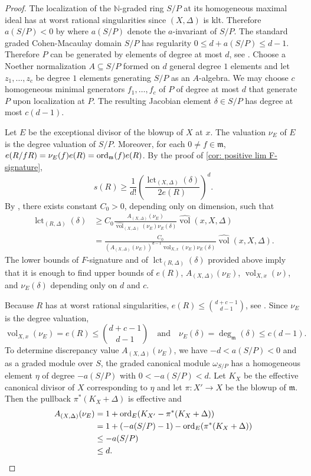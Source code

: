 \documentclass[12pt]{amsart}
\numberwithin{equation}{theorem}
\theoremstyle{plain}
\DeclareMathOperator{\vol}{vol}
\newcommand{\fm}{\mathfrak{m}}
\newcommand{\NN}{\mathbb{N}}
\DeclareMathOperator{\lct}{lct}
\begin{document}
\begin{proof}
    The localization of the $\NN$-graded ring $S/P$ at its homogeneous maximal ideal has at worst rational singularities since $(X,\Delta)$ is klt. Therefore $a(S/P)<0$ by \cite[Theorem~5.1]{KuranoSatoSinghWatanabe2009} where $a(S/P)$ denote the $a$-invariant of $S/P$. The standard graded Cohen-Macaulay domain $S/P$ has regularity $0\leq d+a(S/P)\leq d-1$. Therefore $P$ can be generated by elements of degree at most $d$, see \cite[Section~4a]{Eisenbud2005}. Choose a Noether normalization $A\subseteq S/P$ formed on $d$ general degree $1$ elements and let $z_1,\ldots,z_c$ be degree $1$ elements generating $S/P$ as an $A$-algebra. We may choose $c$ homogeneous minimal generators $f_1,\ldots,f_c$ of $P$ of degree at most $d$ that generate $P$ upon localization at $P$. The resulting Jacobian element $\delta\in S/P$ has degree at most $c(d-1)$.


    Let $E$ be the exceptional divisor of the blowup of $X$ at $x$. The valuation $\nu_E$ of $E$ is the degree valuation of $S/P$. Moreover, for each $0\not=f\in \fm$, $e(R/fR) = \nu_E(f)e(R) = \ord_{\fm}(f)e(R)$. By the proof of \cref{cor: positive lim F-signature}, 
    \[
    s(R) \geq \frac{1}{d!}\left(\frac{\lct_{(X,\Delta)}(\delta)}{2e(R)}\right)^d.
    \]
     By \cite[Lemma~3.4]{Zhuang24}, there exists constant $C_0>0$, depending only on dimension, such that 
    \begin{align*}
    \lct_{(R,\Delta)}(\delta)&\geq C_0 \frac{A_{(X,\Delta)}(\nu_E)}{\widehat{\vol}_{(X,\Delta)}(\nu_E)\nu_E(\delta)}\widehat{\vol}(x,X,\Delta)\\
    &=\frac{C_0}{(A_{(X,\Delta)}(\nu_E))^{d-1}\vol_{X,x}(\nu_E) \nu_E(\delta)}\widehat{\vol}(x,X,\Delta).
    \end{align*}
    The lower bounds of $F$-signature and of $\lct_{(R,\Delta)}(\delta)$ provided above imply that it is enough to find upper bounds of $e(R)$, $A_{(X,\Delta)}(\nu_E)$, $\vol_{X,x}(\nu)$, and $\nu_E(\delta)$ depending only on $d$ and $c$.

    Because $R$ has at worst rational singularities, $e(R)\leq {{d+c-1}\choose{d-1}}$, see \cite[Theorem~3.1]{HunekeWatanabe}. Since $\nu_E$ is the degree valuation, 
    \[
    \vol_{X,x}(\nu_E) = e(R)\leq {{d+c-1}\choose{d-1}}\quad\mbox{and}\quad \nu_E(\delta) = \deg_{\fm}(\delta)\leq c(d-1).
    \]
    To determine discrepancy value $A_{(X,\Delta)}(\nu_E)$, we have $-d<a(S/P)<0$ and as a graded module over $S$, the graded canonical module $\omega_{S/P}$ has a homogeneous element $\eta$ of degree $-a(S/P)$ with $0<-a(S/P)<d$. Let $K_X$ be the effective canonical divisor of $X$ corresponding to $\eta$ and let $\pi:X'\to X$ be the blowup of $\fm$. Then the pullback $\pi^*(K_X+\Delta)$ is effective and
    \begin{align*}
    A_{(X,\Delta)}(\nu_E)&=1+\operatorname{{ord}}_E(K_{X'}-\pi^*(K_X+\Delta)) \\
    &=1+(-a(S/P)-1) - \operatorname{{ord}}_E(\pi^*(K_X+\Delta))\\
    &\leq -a(S/P)\\
    &\leq d.\qedhere
    \end{align*}
\end{proof}
\end{document}
